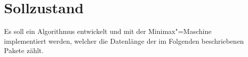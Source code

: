 \chapter{Sollzustand}
\label{chapter:Pflichtenheft-Sollzustand}

Es soll ein Algorithmus entwickelt und mit der Minimax"=Maschine implementiert werden, welcher die Datenlänge der im Folgenden beschriebenen Pakete zählt.



